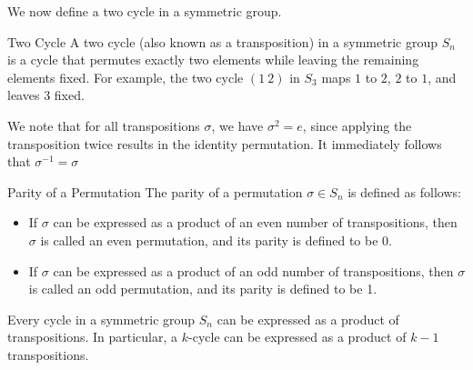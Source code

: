 \documentclass[openany]{book}
\begin{document}
We now define a two cycle in a symmetric group.
\begin{mydefinition}{Two Cycle}
    A two cycle (also known as a transposition) in a symmetric group \( S_n \) is a cycle that permutes exactly two elements while leaving the remaining elements fixed. For example, the two cycle \( (1\ 2) \) in \( S_3 \) maps \( 1 \) to \( 2 \), \( 2 \) to \( 1 \), and leaves \( 3 \) fixed.
\end{mydefinition}
\begin{mynote}
    We note that for all transpositions $\sigma$, we have $\sigma^2 = e$, since applying the transposition twice results in the identity permutation. It immediately follows that $\sigma^{-1} = \sigma$
\end{mynote}
\begin{mydefinition}{Parity of a Permutation}
    The parity of a permutation \( \sigma \in S_n \) is defined as follows:
    \begin{itemize}
        \item If \( \sigma \) can be expressed as a product of an even number of transpositions, then \( \sigma \) is called an even permutation, and its parity is defined to be 0.
        \item If \( \sigma \) can be expressed as a product of an odd number of transpositions, then \( \sigma \) is called an odd permutation, and its parity is defined to be 1.
    \end{itemize}
\end{mydefinition}
\begin{mytheorem}
    Every cycle in a symmetric group \( S_n \) can be expressed as a product of transpositions. In particular, a $k$-cycle can be expressed as a product of \( k-1 \) transpositions.
\end{mytheorem}
\end{document}
